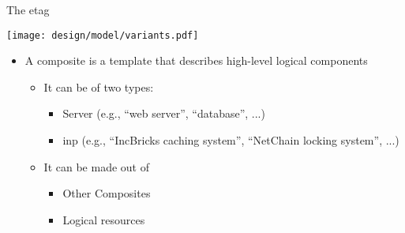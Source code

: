 \begin{frame}{The \Gls*{etag}}

    \vspace{2mm}

    \centering
    \texttt{[image: design/model/variants.pdf]}

    \vspace{1mm}

    \begin{itemize}
        \item A composite is a template that describes high-level logical components
        \begin{itemize}
            \item It can be of two types:
            \begin{itemize}
                \item Server (e.g., “web server”, “database”, ...)
                \item \gls*{inp} (e.g., “IncBricks caching system”, “NetChain locking system”, ...)
            \end{itemize}
            \item It can be made out of
            \begin{itemize}
                \item Other Composites
                \item Logical resources
            \end{itemize}
        \end{itemize}
    \end{itemize}

    
\end{frame}

